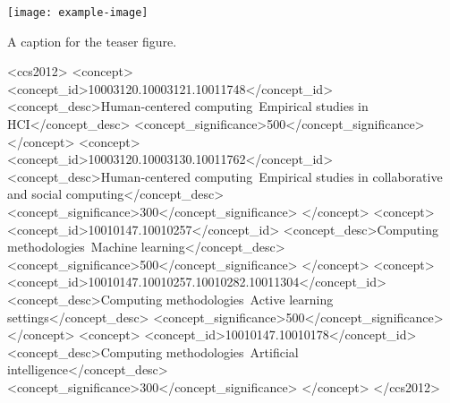 \title[\maintitle]{\fulltitle}
\authorlist\renewcommand{\shortauthors}{\authorabbr}

\begin{teaserfigure}
\centering
\texttt{[image: example-image]}
\caption{
A caption for the teaser figure.
}\label{fig:diagram}
\end{teaserfigure}

\begin{abstract} %
An abstract contains a maximum of 150 words and answers following questions: 1) What is the problem? 2) What did we do? 3) What did we find? 4) What are the wider implications?
\end{abstract}

\begin{CCSXML}
<ccs2012>
    <concept>
        <concept_id>10003120.10003121.10011748</concept_id>
        <concept_desc>Human-centered computing~Empirical studies in HCI</concept_desc>
        <concept_significance>500</concept_significance>
    </concept>
    <concept>
        <concept_id>10003120.10003130.10011762</concept_id>
        <concept_desc>Human-centered computing~Empirical studies in collaborative and social computing</concept_desc>
        <concept_significance>300</concept_significance>
    </concept>
    <concept>
        <concept_id>10010147.10010257</concept_id>
        <concept_desc>Computing methodologies~Machine learning</concept_desc>
        <concept_significance>500</concept_significance>
    </concept>
    <concept>
       <concept_id>10010147.10010257.10010282.10011304</concept_id>
       <concept_desc>Computing methodologies~Active learning settings</concept_desc>
       <concept_significance>500</concept_significance>
    </concept>
    <concept>
        <concept_id>10010147.10010178</concept_id>
        <concept_desc>Computing methodologies~Artificial intelligence</concept_desc>
        <concept_significance>300</concept_significance>
    </concept>
 </ccs2012>
\end{CCSXML}




